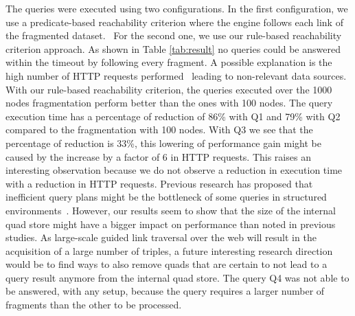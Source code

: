 The queries were executed using two configurations.
In the first configuration, we use a predicate-based reachability criterion where the engine follows each link of the fragmented dataset.~
For the second one, we use our rule-based reachability criterion approach.
As shown in Table \ref{tab:result} no queries could be answered within the timeout by following every fragment.
A possible explanation is the high number of HTTP requests performed~\cite{Hartig2016} leading to non-relevant data sources. 
With our rule-based reachability criterion, the queries executed over the 1000 nodes fragmentation perform better than the ones with 100 nodes.
The query execution time has a percentage of reduction of 86\% with Q1 and 79\% with Q2 compared to the fragmentation with 100 nodes.
With Q3 we see that the percentage of reduction is 33\%, this lowering of performance gain might be caused by the increase by a factor of 6 in HTTP requests.
This raises an interesting observation because we do not observe a reduction in execution time with a reduction in HTTP requests.
Previous research has proposed that inefficient query plans might be the bottleneck of some queries in structured environments~\cite{taelman2023,eschauzier_quweda_2023}.
However, our results seem to show that the size of the internal quad store might have a bigger impact on performance than noted in previous studies.
As large-scale guided link traversal over the web will result in the acquisition of a large number of triples, a future interesting research direction would be to find ways to also remove quads that are certain to not lead to a query result anymore from the internal quad store.
The query Q4 was not able to be answered, with any setup, because the query requires a larger number of fragments than the other to be processed.

